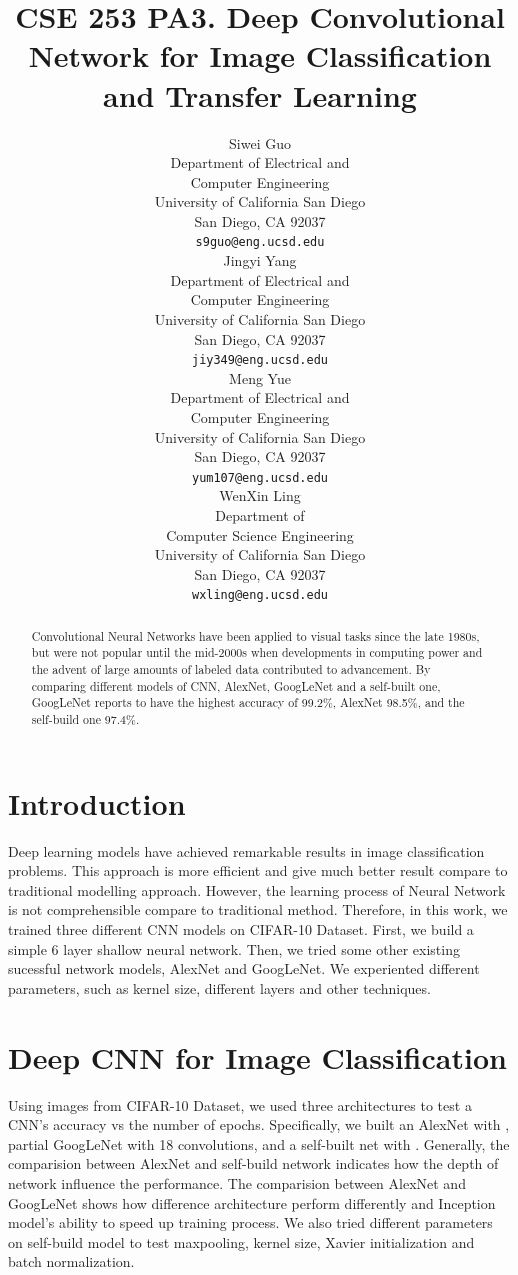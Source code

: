 \documentclass{article} %
\title{CSE 253 PA3. Deep Convolutional Network for Image Classification and Transfer Learning}
\author{
Siwei Guo \\
Department of Electrical and\\ 
Computer Engineering\\
University of California San Diego\\
San Diego, CA 92037 \\
\texttt{s9guo@eng.ucsd.edu} \\
\And
Jingyi Yang \\
Department of Electrical and\\ 
Computer Engineering\\
University of California San Diego\\
San Diego, CA 92037 \\
\texttt{jiy349@eng.ucsd.edu} \\
\And
Meng Yue \\
Department of Electrical and\\ 
Computer Engineering\\
University of California San Diego\\
San Diego, CA 92037 \\
\texttt{yum107@eng.ucsd.edu} \\
\And
WenXin Ling \\
Department of \\
Computer Science Engineering\\
University of California San Diego\\
San Diego, CA 92037 \\
\texttt{wxling@eng.ucsd.edu} \\
}
\begin{document}
\maketitle

\begin{abstract}
Convolutional Neural Networks have been applied to visual tasks since the late 1980s, but were not popular until the mid-2000s when developments in computing power and the advent of large amounts of labeled data contributed to advancement. By comparing different models of CNN, AlexNet, GoogLeNet and a self-built one, GoogLeNet reports to have the highest accuracy of 99.2\%, AlexNet 98.5\%, and the self-build one 97.4\%.
\end{abstract}

\section{Introduction}
Deep learning models have achieved remarkable results in image classification problems. This approach is more efficient and give much better result compare to traditional modelling approach. However, the learning process of Neural Network is not comprehensible compare to traditional method. Therefore, in this work, we trained three different CNN models on CIFAR-10 Dataset. First, we build a simple 6 layer shallow neural network. Then, we tried some other existing sucessful network models, AlexNet and GoogLeNet. We experiented different parameters, such as kernel size, different layers and other techniques.


\section{Deep CNN for Image Classification}
Using images from CIFAR-10 Dataset, we used three architectures to test a CNN's accuracy vs the number of 
epochs. Specifically, we built an AlexNet with , partial GoogLeNet with 18 convolutions, and a self-built 
net with . Generally, the comparision between AlexNet and self-build network indicates how the depth of 
network influence the performance. The comparision between AlexNet and GoogLeNet shows how difference architecture
perform differently and Inception model's ability to speed up training process. We also tried different
parameters on self-build model to test maxpooling, kernel size, Xavier initialization and batch normalization. 
\end{document}
